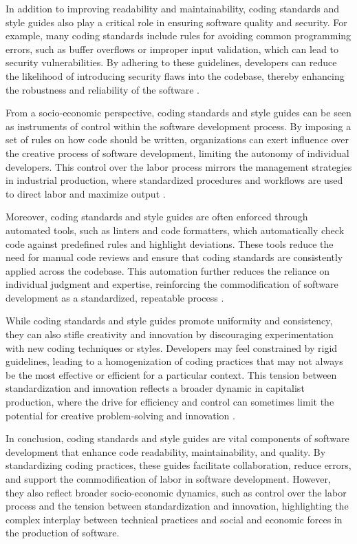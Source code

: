 \begin{refsection}
In addition to improving readability and maintainability, coding standards and style guides also play a critical role in ensuring software quality and security. For example, many coding standards include rules for avoiding common programming errors, such as buffer overflows or improper input validation, which can lead to security vulnerabilities. By adhering to these guidelines, developers can reduce the likelihood of introducing security flaws into the codebase, thereby enhancing the robustness and reliability of the software \cite[pp.~45-48]{Pressman2019}.

From a socio-economic perspective, coding standards and style guides can be seen as instruments of control within the software development process. By imposing a set of rules on how code should be written, organizations can exert influence over the creative process of software development, limiting the autonomy of individual developers. This control over the labor process mirrors the management strategies in industrial production, where standardized procedures and workflows are used to direct labor and maximize output \cite[pp.~75-77]{Martin2008}.

Moreover, coding standards and style guides are often enforced through automated tools, such as linters and code formatters, which automatically check code against predefined rules and highlight deviations. These tools reduce the need for manual code reviews and ensure that coding standards are consistently applied across the codebase. This automation further reduces the reliance on individual judgment and expertise, reinforcing the commodification of software development as a standardized, repeatable process \cite[pp.~90-92]{Fowler2019}.

While coding standards and style guides promote uniformity and consistency, they can also stifle creativity and innovation by discouraging experimentation with new coding techniques or styles. Developers may feel constrained by rigid guidelines, leading to a homogenization of coding practices that may not always be the most effective or efficient for a particular context. This tension between standardization and innovation reflects a broader dynamic in capitalist production, where the drive for efficiency and control can sometimes limit the potential for creative problem-solving and innovation \cite[pp.~102-105]{Bass2021}.

In conclusion, coding standards and style guides are vital components of software development that enhance code readability, maintainability, and quality. By standardizing coding practices, these guides facilitate collaboration, reduce errors, and support the commodification of labor in software development. However, they also reflect broader socio-economic dynamics, such as control over the labor process and the tension between standardization and innovation, highlighting the complex interplay between technical practices and social and economic forces in the production of software.


\end{refsection}
